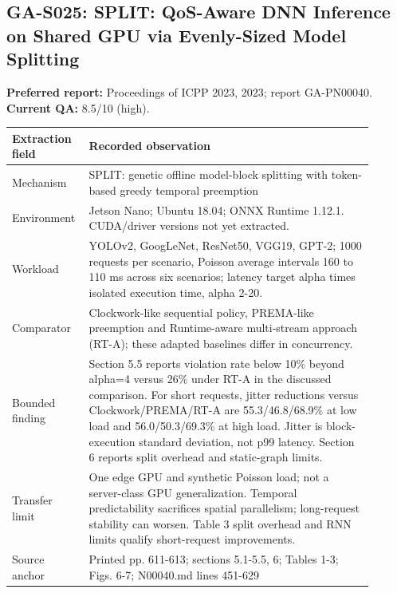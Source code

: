 \subsection{GA-S025: SPLIT: QoS-Aware DNN Inference on Shared GPU via Evenly-Sized Model Splitting}
\textbf{Preferred report:} Proceedings of ICPP 2023, 2023; report GA-PN00040. \textbf{Current QA:} 8.5/10 (high).
\begin{longtable}{P{0.15\linewidth}P{0.75\linewidth}}
\toprule Extraction field & Recorded observation\\\midrule\endhead
Mechanism & SPLIT: genetic offline model-block splitting with token-based greedy temporal preemption\\
Environment & Jetson Nano; Ubuntu 18.04; ONNX Runtime 1.12.1. CUDA/driver versions not yet extracted.\\
Workload & YOLOv2, GoogLeNet, ResNet50, VGG19, GPT-2; 1000 requests per scenario, Poisson average intervals 160 to 110 ms across six scenarios; latency target alpha times isolated execution time, alpha 2-20.\\
Comparator & Clockwork-like sequential policy, PREMA-like preemption and Runtime-aware multi-stream approach (RT-A); these adapted baselines differ in concurrency.\\
Bounded finding & Section 5.5 reports violation rate below 10\% beyond alpha=4 versus 26\% under RT-A in the discussed comparison. For short requests, jitter reductions versus Clockwork/PREMA/RT-A are 55.3/46.8/68.9\% at low load and 56.0/50.3/69.3\% at high load. Jitter is block-execution standard deviation, not p99 latency. Section 6 reports split overhead and static-graph limits.\\
Transfer limit & One edge GPU and synthetic Poisson load; not a server-class GPU generalization. Temporal predictability sacrifices spatial parallelism; long-request stability can worsen. Table 3 split overhead and RNN limits qualify short-request improvements.\\
Source anchor & Printed pp. 611-613; sections 5.1-5.5, 6; Tables 1-3; Figs. 6-7; N00040.md lines 451-629\\
\bottomrule\end{longtable}
